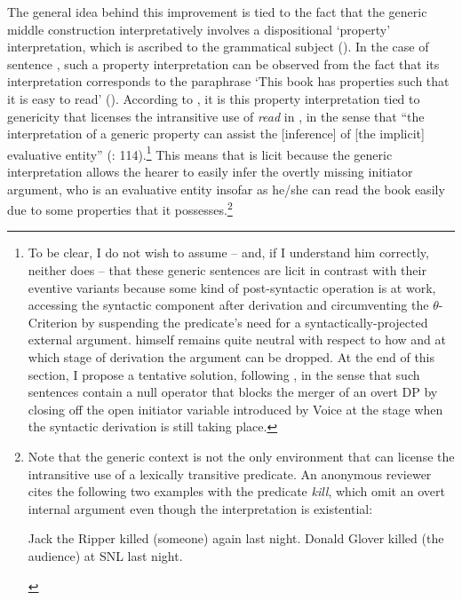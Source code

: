 \documentclass[output=paper,
modfonts,nonflat,
newtxmath
]{langsci/langscibook}
\begin{document}
\begin{exe}
\ex \label{ex:lenardic: 34}
\begin{xlist}
\label{ex:lenardic: 34a}
 \label{ex:lenardic: 34b}
\end{xlist}
\end{exe} \par

\noindent The general idea behind this improvement is tied to the fact that the generic middle construction  interpretatively involves a dispositional `property' interpretation, which is ascribed to the grammatical subject (\citealt{lekakou2004}). In the case of sentence , such a property interpretation can be observed from the fact that its interpretation corresponds to the paraphrase `This book has properties such that it is easy to read' (\citealt{fagan1992}). According to \citeauthor{hartl2012}, it is this property interpretation tied to genericity that licenses the intransitive use of \textit{read} in , in the sense that “the interpretation of a generic property can assist the [inference] of [the implicit] evaluative entity'' (\citealt{hartl2012}: 114).\footnote{To be clear, I do not wish to assume -- and, if I understand him correctly, neither does \citeauthor{hartl2012} -- that  these generic sentences are licit in contrast with their eventive variants because  some kind of post-syntactic operation is at work,  accessing the syntactic component after derivation and circumventing the $\theta$-Criterion by suspending the predicate's need for a syntactically-projected external argument. \citet{hartl2012} himself remains quite neutral with respect to how and at which stage of derivation the argument can be dropped.  At the end of this section, I propose a tentative solution, following \citet{bruening2012}, in the sense that such sentences contain a null operator that blocks the merger of an overt DP by closing off the open initiator variable introduced by Voice at the stage when the syntactic derivation is still taking place.} This means that  is licit because the generic interpretation allows the hearer to easily infer the overtly missing initiator argument, who is an evaluative entity insofar as he/she can read the book easily due to some properties that it possesses.\footnote{Note that the generic context is not the only environment that can license the intransitive use of a lexically transitive predicate. An anonymous reviewer cites the following two examples with the predicate \textit{kill}, which omit an overt internal argument even though the interpretation is existential: \begin{exe} \ex \label{fn 1} Jack the Ripper killed (someone) again last night. \ex \label{fn 2} Donald Glover killed (the audience) at SNL last night.\end{exe}
}
\end{document}

